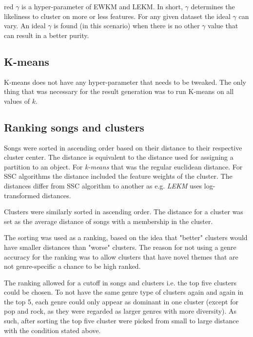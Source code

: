 \documentclass[../report.tex]{subfiles}
\begin{document}
\begin{color}{red}
$\gamma$ is a hyper-parameter of EWKM and LEKM. In short, $\gamma$ determines the likeliness to cluster on more or less features. For any given dataset the ideal $\gamma$ can vary. An ideal $\gamma$ is found (in this scenario) when there is no other $\gamma$ value that can result in a better purity.
\end{color}


\subsection{K-means}
K-means does not have any hyper-parameter that needs to be tweaked. The only thing that was necessary for the result generation was to run K-means on all values of $k$.


\subsection{Ranking songs and clusters}
Songs were sorted in ascending order based on their distance to their respective cluster center. The distance is equivalent to the distance used for assigning a partition to an object. For \textit{k-means} that was the regular euclidean distance. For SSC algorithms the distance included the feature weights of the cluster. The distances differ from SSC algorithm to another as e.g. \textit{LEKM} uses log-transformed distances.

Clusters were similarly sorted in ascending order. The distance for a cluster was set as the average distance of songs with a membership in the cluster.

The sorting was used as a ranking, based on the idea that "better" clusters would have smaller distances than "worse" clusters. The reason for not using a genre accuracy for the ranking was to allow clusters that have novel themes that are not genre-specific a chance to be high ranked.

The ranking allowed for a cutoff in songs and clusters i.e. the top five clusters could be chosen. To not have the same genre type of clusters again and again in the top 5, each genre could only appear as dominant in one cluster (except for pop and rock, as they were regarded as larger genres with more diversity). As such, after sorting the top five cluster were picked from small to large distance with the condition stated above.
\end{document}
